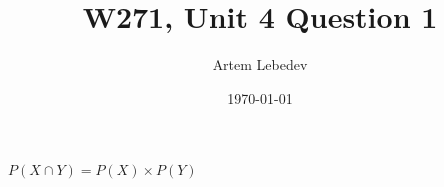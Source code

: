 \documentclass{article}
\author{Artem Lebedev}
\title{W271, Unit 4 Question 1}
\date{\today}
\begin{document}
	
\maketitle

\begin{center}
		$P(X\cap Y) = P(X)\times P(Y)$
\end{center}
\end{document}
